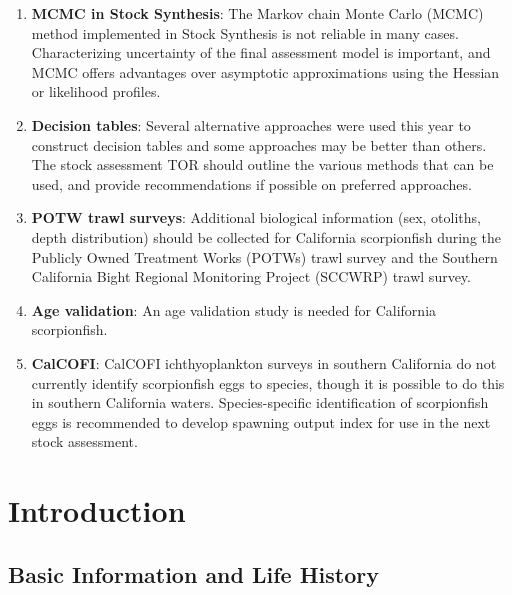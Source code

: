 \documentclass[12pt,]{article}
\begin{document}
\begin{enumerate}
\item \textbf{MCMC in Stock Synthesis}: The Markov chain Monte Carlo (MCMC) 
method implemented in Stock Synthesis is not reliable in many cases.  
Characterizing uncertainty of the final assessment model is important, and 
MCMC offers advantages over asymptotic approximations using the Hessian or 
likelihood profiles. 

\item \textbf{Decision tables}: Several alternative approaches were used this 
year to construct decision tables and some approaches may be better than others. 
The stock assessment TOR should outline the various methods that can be used, 
and provide recommendations if possible on preferred approaches.


\item \textbf{POTW trawl surveys}: Additional biological information 
(sex, otoliths, depth distribution) should be collected for California 
scorpionfish during the Publicly Owned Treatment Works (POTWs) trawl 
survey and the Southern California Bight Regional Monitoring Project 
(SCCWRP) trawl survey.

\item \textbf{Age validation}: An age validation study is needed for 
California scorpionfish.


\item \textbf{CalCOFI}: CalCOFI ichthyoplankton surveys in southern California 
do not currently identify scorpionfish eggs to species, though it is possible to 
do this in southern California waters. Species-specific identification of 
scorpionfish eggs is recommended to develop spawning output index for use in 
the next stock assessment.



\end{enumerate}

\FloatBarrier

\newpage

\renewcommand{\thefigure}{\arabic{figure}}
\renewcommand{\thetable}{\arabic{table}}

\setcounter{figure}{0} \setcounter{table}{0}


\section{Introduction}\label{introduction}

\subsection{Basic Information and Life
History}\label{basic-information-and-life-history}
\end{document}
